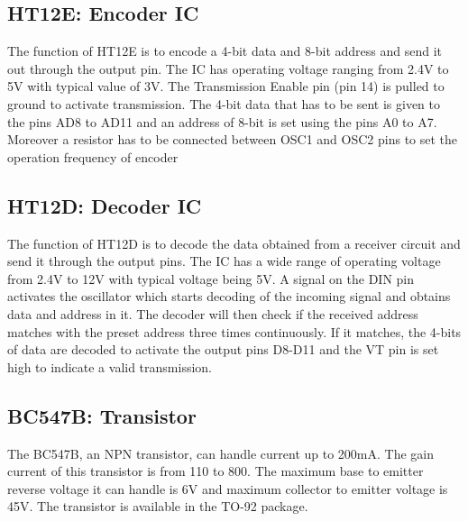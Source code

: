 \newpage

\subsection{HT12E: Encoder IC}


The function of HT12E is to encode a 4-bit data and 8-bit address and
send it out through the output pin. The IC has operating voltage
ranging from 2.4V to 5V with typical value of 3V. The Transmission
Enable pin (pin 14) is pulled to ground to activate transmission. The
4-bit data that has to be sent is given to the pins AD8 to AD11 and
an address of 8-bit is set using the pins A0 to A7.  Moreover a
resistor has to be connected between OSC1 and OSC2 pins to set the
operation frequency of encoder

\vspace*{1.5cm}

\subsection{HT12D: Decoder IC}


The function of HT12D is to decode the data obtained from a receiver
circuit and send it through the output pins. The IC has a wide range
of operating voltage from 2.4V to 12V with typical voltage being 5V.
A signal on the DIN pin activates the oscillator which starts
decoding of the incoming signal and obtains data and address in it.
The decoder will then check if the received address matches with the
preset address three times continuously. If it matches, the 4-bits of
data are decoded to activate the output pins D8-D11 and the VT pin is
set high to indicate a valid transmission.

\subsection{BC547B: Transistor}


The BC547B, an NPN transistor, can handle current up to 200mA. The
gain current of this transistor is from 110 to 800. The maximum base
to emitter reverse voltage it can handle is 6V and maximum collector
to emitter voltage is 45V. The transistor is available in the TO-92 package.

